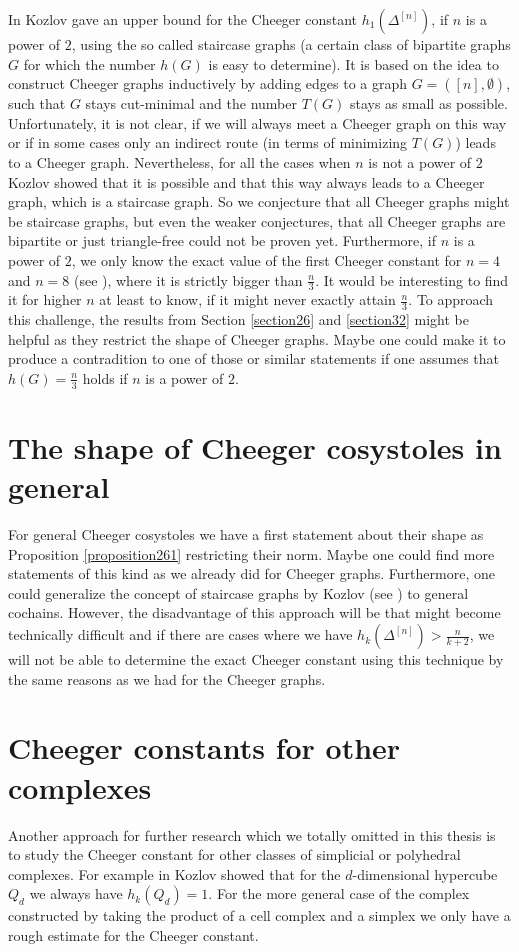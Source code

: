 In \cite{1} Kozlov gave an upper bound for the Cheeger constant \(h_1(\Delta^{[n]})\), if \(n\) is a power of \(2\), using the so called staircase graphs (a certain class of bipartite graphs \(G\) for which the number \(h(G)\) is easy to determine). It is based on the idea to construct Cheeger graphs inductively by adding edges to a graph \(G=([n],\emptyset)\), such that \(G\) stays cut-minimal and the number \(T(G)\) stays as small as possible. Unfortunately, it is not clear, if we will always meet a Cheeger graph on this way or if in some cases only an indirect route (in terms of minimizing \(T(G)\)) leads to a Cheeger graph. Nevertheless, for all the cases when \(n\) is not a power of \(2\) Kozlov showed that it is possible and that this way always leads to a Cheeger graph, which is a staircase graph. So we conjecture that all Cheeger graphs might be staircase graphs, but even the weaker conjectures, that all Cheeger graphs are bipartite or just triangle-free could not be proven yet. Furthermore, if \(n\) is a power of \(2\), we only know the exact value of the first Cheeger constant for \(n=4\) and \(n=8\) (see \cite{1}), where it is strictly bigger than \(\frac{n}{3}\). It would be interesting to find it for higher \(n\) at least to know, if it might never exactly attain \(\frac{n}{3}\). To approach this challenge, the results from Section \ref{section26} and \ref{section32} might be helpful as they restrict the shape of Cheeger graphs. Maybe one could make it to produce a contradition to one of those or similar statements if one assumes that \(h(G)=\frac{n}{3}\) holds if \(n\) is a power of \(2\).

\section{The shape of Cheeger cosystoles in general}

For general Cheeger cosystoles we have a first statement about their shape as Proposition \ref{proposition261} restricting their norm. Maybe one could find more statements of this kind as we already did for Cheeger graphs. Furthermore, one could generalize the concept of staircase graphs by Kozlov (see \cite{1}) to general cochains. However, the disadvantage of this approach will be that might become technically difficult and if there are cases where we have \(h_k(\Delta^{[n]})>\frac{n}{k+2}\), we will not be able to determine the exact Cheeger constant using this technique by the same reasons as we had for the Cheeger graphs.

\section{Cheeger constants for other complexes}

Another approach for further research which we totally omitted in this thesis is to study the Cheeger constant for other classes of simplicial or polyhedral complexes. For example in \cite{6} Kozlov showed that for the \(d\)-dimensional hypercube \(Q_d\) we always have \(h_k(Q_d)=1\). For the more general case of the complex constructed by taking the product of a cell complex and a simplex we only have a rough estimate for the Cheeger constant.